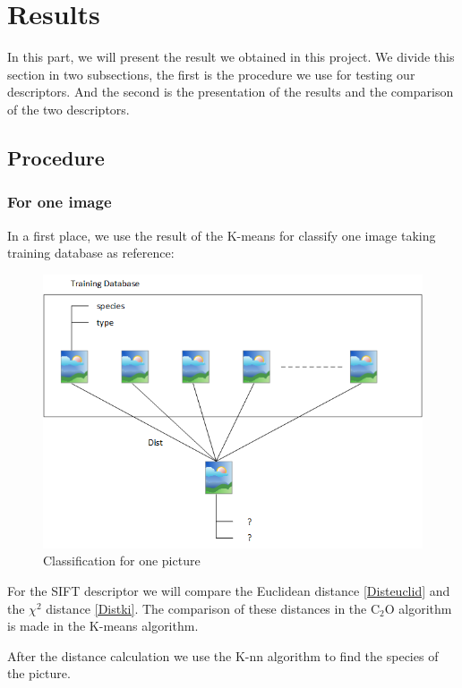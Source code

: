 \documentclass[12pt]{article}
\begin{document}
\section{Results}

In this part, we will present the result we obtained in this project. We divide this section in two subsections, the first is the procedure we use for testing our descriptors. And the second is the presentation of the results and the comparison of the two descriptors.

\subsection{Procedure}

\subsubsection{For one image}
In a first place, we use the result of the K-means for classify one image taking training database as reference:

\begin{figure}[h]
    \center
    \includegraphics[scale=0.95]{proced.png}
    \caption{Classification for one picture}\label{fig:proced1}
\end{figure}

For the SIFT descriptor we will compare the Euclidean distance \eqref{Disteuclid} and the $\chi^2$ distance \eqref{Distki}. The comparison of these distances in the C$_2$O algorithm is made in the K-means algorithm.

After the distance calculation we use the K-nn algorithm to find the species of the picture.
\end{document}
